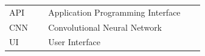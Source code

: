 
\begin{longtable}{@{}p{0.18\linewidth}p{0.72\linewidth}@{}}
API & Application Programming Interface \\
CNN & Convolutional Neural Network \\
UI & User Interface \\
\end{longtable}
